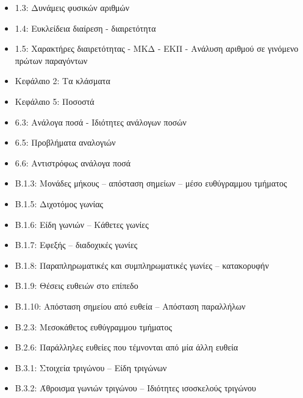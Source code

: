 \documentclass[a4paper,10pt]{report}
\begin{document}
\vspace{2em}
\begin{itemize}
\item 1.3: Δυνάμεις φυσικών αριθμών
\item 1.4: Ευκλείδεια διαίρεση - διαιρετότητα
\item 1.5: Χαρακτήρες διαιρετότητας - ΜΚΔ - ΕΚΠ - Ανάλυση αριθμού σε γινόμενο πρώτων παραγόντων
\item Κεφάλαιο 2: Τα κλάσματα
\item Κεφάλαιο 5: Ποσοστά
\item 6.3: Ανάλογα ποσά - Ιδιότητες ανάλογων ποσών
\item 6.5: Προβλήματα αναλογιών
\item 6.6: Αντιστρόφως ανάλογα ποσά
\item Β.1.3: Μονάδες μήκους – απόσταση σημείων – μέσο ευθύγραμμου τμήματος 
\item Β.1.5: Διχοτόμος γωνίας 
\item Β.1.6: Είδη γωνιών – Κάθετες γωνίες 
\item Β.1.7: Εφεξής – διαδοχικές γωνίες 
\item Β.1.8: Παραπληρωματικές και συμπληρωματικές γωνίες – κατακορυφήν 
\item Β.1.9: Θέσεις ευθειών στο επίπεδο 
\item Β.1.10: Απόσταση σημείου από ευθεία – Απόσταση παραλλήλων 
\item Β.2.3: Μεσοκάθετος ευθύγραμμου τμήματος 
\item Β.2.6: Παράλληλες ευθείες που τέμνονται από μία άλλη ευθεία
\item Β.3.1: Στοιχεία τριγώνου – Είδη τριγώνων 
\item Β.3.2: Άθροισμα γωνιών τριγώνου – Ιδιότητες ισοσκελούς τριγώνου 
\end{itemize}
\end{document}
